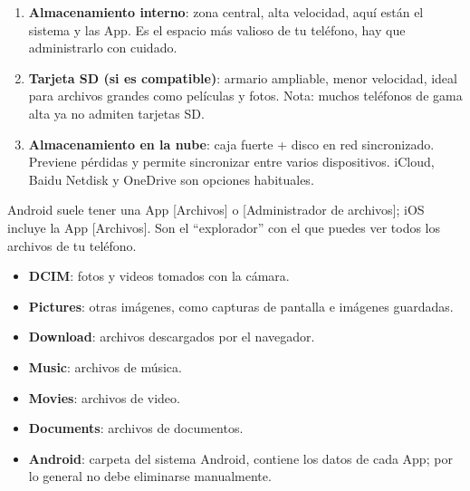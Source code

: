 


\begin{enumerate}
  \item \textbf{Almacenamiento interno}: zona central, alta velocidad, aquí están el sistema y las App. Es el espacio más valioso de tu teléfono, hay que administrarlo con cuidado.
  \item \textbf{Tarjeta SD (si es compatible)}: armario ampliable, menor velocidad, ideal para archivos grandes como películas y fotos. Nota: muchos teléfonos de gama alta ya no admiten tarjetas SD.
  \item \textbf{Almacenamiento en la nube}: caja fuerte + disco en red sincronizado. Previene pérdidas y permite sincronizar entre varios dispositivos. iCloud, Baidu Netdisk y OneDrive son opciones habituales.
\end{enumerate}


Android suele tener una App [Archivos] o [Administrador de archivos]; iOS incluye la App [Archivos]. Son el “explorador” con el que puedes ver todos los archivos de tu teléfono.


\begin{itemize}
  \item \textbf{DCIM}: fotos y videos tomados con la cámara.
  \item \textbf{Pictures}: otras imágenes, como capturas de pantalla e imágenes guardadas.
  \item \textbf{Download}: archivos descargados por el navegador.
  \item \textbf{Music}: archivos de música.
  \item \textbf{Movies}: archivos de video.
  \item \textbf{Documents}: archivos de documentos.
  \item \textbf{Android}: carpeta del sistema Android, contiene los datos de cada App; por lo general no debe eliminarse manualmente.
\end{itemize}

